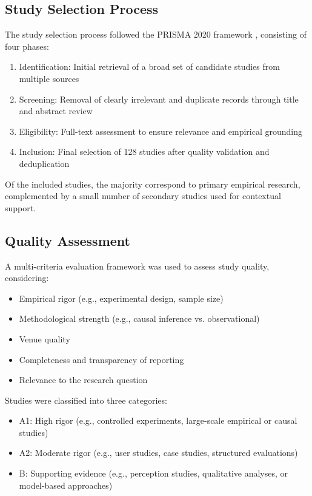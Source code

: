 \documentclass[conference]{IEEEtran}
\begin{document}
\subsection{Study Selection Process}

The study selection process followed the PRISMA 2020 framework \cite{page2021prisma}, consisting of four phases:

\begin{enumerate}
    \item Identification: Initial retrieval of a broad set of candidate studies from multiple sources
    \item Screening: Removal of clearly irrelevant and duplicate records through title and abstract review
    \item Eligibility: Full-text assessment to ensure relevance and empirical grounding
    \item Inclusion: Final selection of 128 studies after quality validation and deduplication
\end{enumerate}

Of the included studies, the majority correspond to primary empirical research, complemented by a small number of secondary studies used for contextual support.

\subsection{Quality Assessment}

A multi-criteria evaluation framework was used to assess study quality, considering:

\begin{itemize}
    \item Empirical rigor (e.g., experimental design, sample size)
    \item Methodological strength (e.g., causal inference vs. observational)
    \item Venue quality
    \item Completeness and transparency of reporting
    \item Relevance to the research question
\end{itemize}

Studies were classified into three categories:

\begin{itemize}
    \item A1: High rigor (e.g., controlled experiments, large-scale empirical or causal studies)
    \item A2: Moderate rigor (e.g., user studies, case studies, structured evaluations)
    \item B: Supporting evidence (e.g., perception studies, qualitative analyses, or model-based approaches)
\end{itemize}
\end{document}
